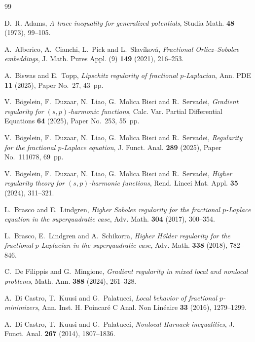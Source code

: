 \documentclass[11pt,reqno]{amsart}
\numberwithin{equation}{section}
\theoremstyle{remark}
\begin{document}
\begin{thebibliography}{99}

D.~R. Adams,
\emph{A trace inequality for generalized potentials},
Studia Math. \textbf{48} (1973), 99--105.

A.~Alberico, A.~Cianchi, L.~Pick and L.~Slav\'ikov\'a,
\emph{Fractional Orlicz--Sobolev embeddings},
J. Math. Pures Appl. (9) \textbf{149} (2021), 216--253.

A.~Biswas and E.~Topp,
\emph{Lipschitz regularity of fractional $p$-Laplacian},
Ann. PDE \textbf{11} (2025), Paper No.~27, 43~pp.

V.~B\"ogelein, F.~Duzaar, N.~Liao, G.~Molica Bisci and R.~Servadei,
\emph{Gradient regularity for $(s,p)$-harmonic functions},
Calc. Var. Partial Differential Equations \textbf{64} (2025),
Paper No.~253, 55~pp.

V.~B\"ogelein, F.~Duzaar, N.~Liao, G.~Molica Bisci and R.~Servadei,
\emph{Regularity for the fractional $p$-Laplace equation},
J. Funct. Anal. \textbf{289} (2025), Paper No.~111078, 69~pp.

V.~B\"ogelein, F.~Duzaar, N.~Liao, G.~Molica Bisci and R.~Servadei,
\emph{Higher regularity theory for $(s,p)$-harmonic functions},
Rend. Lincei Mat. Appl. \textbf{35} (2024), 311--321.

L.~Brasco and E.~Lindgren,
\emph{Higher Sobolev regularity for the fractional $p$-Laplace equation
in the superquadratic case},
Adv. Math. \textbf{304} (2017), 300--354.

L.~Brasco, E.~Lindgren and A.~Schikorra,
\emph{Higher H\"older regularity for the fractional $p$-Laplacian in the
superquadratic case},
Adv. Math. \textbf{338} (2018), 782--846.

C.~De Filippis and G.~Mingione,
\emph{Gradient regularity in mixed local and nonlocal problems},
Math. Ann. \textbf{388} (2024), 261--328.

A.~Di Castro, T.~Kuusi and G.~Palatucci,
\emph{Local behavior of fractional $p$-minimizers},
Ann. Inst. H. Poincar\'e C Anal. Non Lin\'eaire \textbf{33} (2016),
1279--1299.

A.~Di Castro, T.~Kuusi and G.~Palatucci,
\emph{Nonlocal Harnack inequalities},
J. Funct. Anal. \textbf{267} (2014), 1807--1836.


\end{thebibliography}
\end{document}
